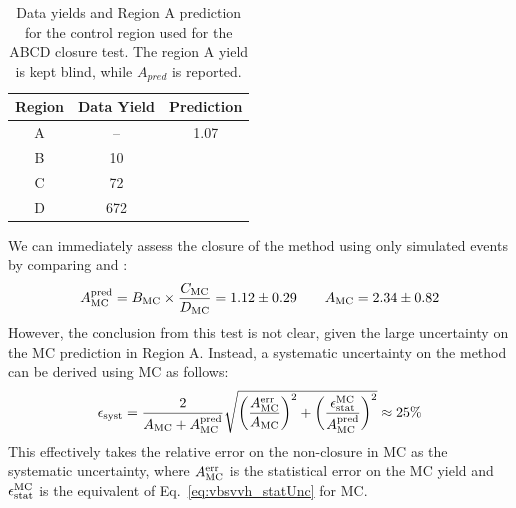 \begin{table}[htbp]
    \centering
    \caption[VBS $\VVH$ ABCD yields]{
        Data yields and Region A prediction for the control region used for the ABCD closure test. 
        The region A yield is kept blind, while $A_{pred}$ is reported.
    }
    \begin{tabular}{ccc}
    \toprule
    \textbf{Region} & Data Yield & Prediction \\
    \midrule
    A               & --         & 1.07       \\
    B               & 10         &            \\
    C               & 72         &            \\
    D               & 672        &            \\
    \bottomrule
    \end{tabular}
    \label{tab:0lepABCDregion}
\end{table}

We can immediately assess the closure of the method using only simulated events by comparing \AMCPred and \AMC:
\begin{equation*}
    \AMCPred = \BMC\times\frac{\CMC}{\DMC} = 1.12\pm0.29 \qquad \AMC = 2.34\pm0.82 %
\end{equation*}
However, the conclusion from this test is not clear, given the large uncertainty on the MC prediction in Region A. 
Instead, a systematic uncertainty on the method \Esyst can be derived using MC as follows:
\begin{equation}
    \Esyst = 
        \frac{2}{\AMC + \AMCPred}
        \sqrt{\bigg(\frac{\AMC^\text{err}}{\AMC}\bigg)^2 + \bigg(\frac{\Estat^\mathrm{MC}}{\AMCPred}\bigg)^2} \approx 25\% %
\end{equation}
This effectively takes the relative error on the non-closure in MC as the systematic uncertainty, where $A_{\mathrm{MC}}^\text{err}$ is the statistical error on the MC yield and $\epsilon_{\text{stat}}^\mathrm{MC}$ is the equivalent of Eq.~\ref{eq:vbsvvh_statUnc} for MC.

